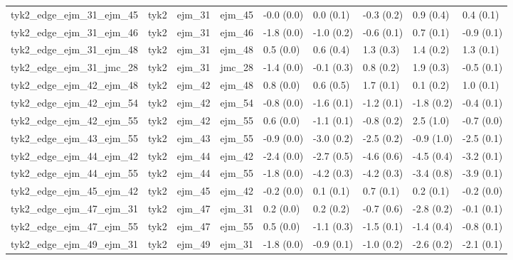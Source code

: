 \begin{tabular}{lllllllll}
tyk2\_edge\_ejm\_31\_ejm\_45          &      tyk2 &      ejm\_31 &      ejm\_45 &  -0.0 (0.0) &         0.0 (0.1) &  -0.3 (0.2) &   0.9 (0.4) &   0.4 (0.1) \\
tyk2\_edge\_ejm\_31\_ejm\_46          &      tyk2 &      ejm\_31 &      ejm\_46 &  -1.8 (0.0) &        -1.0 (0.2) &  -0.6 (0.1) &   0.7 (0.1) &  -0.9 (0.1) \\
tyk2\_edge\_ejm\_31\_ejm\_48          &      tyk2 &      ejm\_31 &      ejm\_48 &   0.5 (0.0) &         0.6 (0.4) &   1.3 (0.3) &   1.4 (0.2) &   1.3 (0.1) \\
tyk2\_edge\_ejm\_31\_jmc\_28          &      tyk2 &      ejm\_31 &      jmc\_28 &  -1.4 (0.0) &        -0.1 (0.3) &   0.8 (0.2) &   1.9 (0.3) &  -0.5 (0.1) \\
tyk2\_edge\_ejm\_42\_ejm\_48          &      tyk2 &      ejm\_42 &      ejm\_48 &   0.8 (0.0) &         0.6 (0.5) &   1.7 (0.1) &   0.1 (0.2) &   1.0 (0.1) \\
tyk2\_edge\_ejm\_42\_ejm\_54          &      tyk2 &      ejm\_42 &      ejm\_54 &  -0.8 (0.0) &        -1.6 (0.1) &  -1.2 (0.1) &  -1.8 (0.2) &  -0.4 (0.1) \\
tyk2\_edge\_ejm\_42\_ejm\_55          &      tyk2 &      ejm\_42 &      ejm\_55 &   0.6 (0.0) &        -1.1 (0.1) &  -0.8 (0.2) &   2.5 (1.0) &  -0.7 (0.0) \\
tyk2\_edge\_ejm\_43\_ejm\_55          &      tyk2 &      ejm\_43 &      ejm\_55 &  -0.9 (0.0) &        -3.0 (0.2) &  -2.5 (0.2) &  -0.9 (1.0) &  -2.5 (0.1) \\
tyk2\_edge\_ejm\_44\_ejm\_42          &      tyk2 &      ejm\_44 &      ejm\_42 &  -2.4 (0.0) &        -2.7 (0.5) &  -4.6 (0.6) &  -4.5 (0.4) &  -3.2 (0.1) \\
tyk2\_edge\_ejm\_44\_ejm\_55          &      tyk2 &      ejm\_44 &      ejm\_55 &  -1.8 (0.0) &        -4.2 (0.3) &  -4.2 (0.3) &  -3.4 (0.8) &  -3.9 (0.1) \\
tyk2\_edge\_ejm\_45\_ejm\_42          &      tyk2 &      ejm\_45 &      ejm\_42 &  -0.2 (0.0) &         0.1 (0.1) &   0.7 (0.1) &   0.2 (0.1) &  -0.2 (0.0) \\
tyk2\_edge\_ejm\_47\_ejm\_31          &      tyk2 &      ejm\_47 &      ejm\_31 &   0.2 (0.0) &         0.2 (0.2) &  -0.7 (0.6) &  -2.8 (0.2) &  -0.1 (0.1) \\
tyk2\_edge\_ejm\_47\_ejm\_55          &      tyk2 &      ejm\_47 &      ejm\_55 &   0.5 (0.0) &        -1.1 (0.3) &  -1.5 (0.1) &  -1.4 (0.4) &  -0.8 (0.1) \\
tyk2\_edge\_ejm\_49\_ejm\_31          &      tyk2 &      ejm\_49 &      ejm\_31 &  -1.8 (0.0) &        -0.9 (0.1) &  -1.0 (0.2) &  -2.6 (0.2) &  -2.1 (0.1) \\

\end{tabular}
